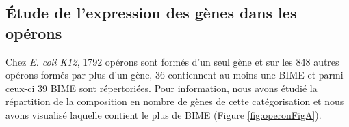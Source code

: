 \documentclass[12pt,a4paper]{report}
\begin{document}
\begin{onehalfspace}
\subsection*{Étude de l'expression des gènes dans les opérons}
Chez \textit{E. coli K12}, 1792 opérons sont formés d'un seul gène et sur les 848 autres opérons formés par plus d'un gène, 36 contiennent au moins une BIME et parmi ceux-ci 39 BIME sont répertoriées. Pour information, nous avons étudié la répartition de la composition en nombre de gènes de cette catégorisation et nous avons visualisé laquelle contient le plus de BIME (Figure \autoref{fig:operonFigA}).

\begin{figure}[h!]
\centering
{}

\end{figure}
\end{onehalfspace}
\end{document}

